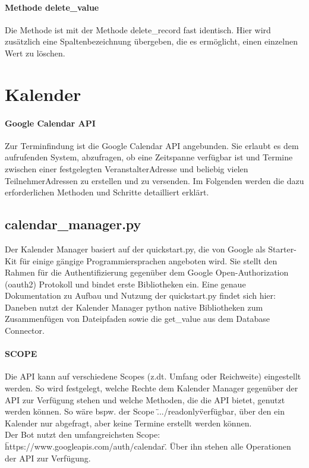             \paragraph{Methode delete\_value}
                Die Methode ist mit der Methode delete\_record fast identisch. Hier wird zusätzlich eine Spaltenbezeichnung übergeben, die es ermöglicht, einen einzelnen Wert zu löschen.


    \section{Kalender}
        \paragraph{Google Calendar API}
            Zur Terminfindung ist die Google Calendar API angebunden. \cite{GoogleCloudConsole} Sie erlaubt es dem aufrufenden System, abzufragen, ob eine Zeitspanne verfügbar ist und Termine zwischen einer festgelegten Veranstalter\-Adresse und beliebig vielen Teilnehmer\-Adressen zu erstellen und zu versenden. \cite{googleCalAPI} Im Folgenden werden die dazu erforderlichen Methoden und Schritte detailliert erklärt.

        \subsection{calendar\_manager.py}
            Der Kalender Manager basiert auf der quickstart.py, die von Google als Starter-Kit für einige gängige Programmiersprachen angeboten wird. Sie stellt den Rahmen für die Authentifizierung gegenüber dem Google Open-Authorization (oauth2) Protokoll und bindet erste Bibliotheken ein. Eine genaue Dokumentation zu Aufbau und Nutzung der quickstart.py findet sich hier: \cite{pythonQuickstart} \\
            Daneben nutzt der Kalender Manager python native Bibliotheken zum Zusammenfügen von Dateipfaden sowie die get\_value aus dem Database Connector.

            \paragraph{SCOPE}
                Die API kann auf verschiedene Scopes (z.dt. Umfang oder Reichweite) eingestellt werden. So wird festgelegt, welche Rechte dem Kalender Manager gegenüber der API zur Verfügung stehen und welche Methoden, die die API bietet, genutzt werden können. So wäre bspw. der Scope \".../readonly\" verfügbar, über den ein Kalender nur abgefragt, aber keine Termine erstellt werden können.\\
                Der Bot nutzt den umfangreichsten Scope: \"https://www.googleapis.com/auth/calendar\". Über ihn stehen alle Operationen der API zur Verfügung.

